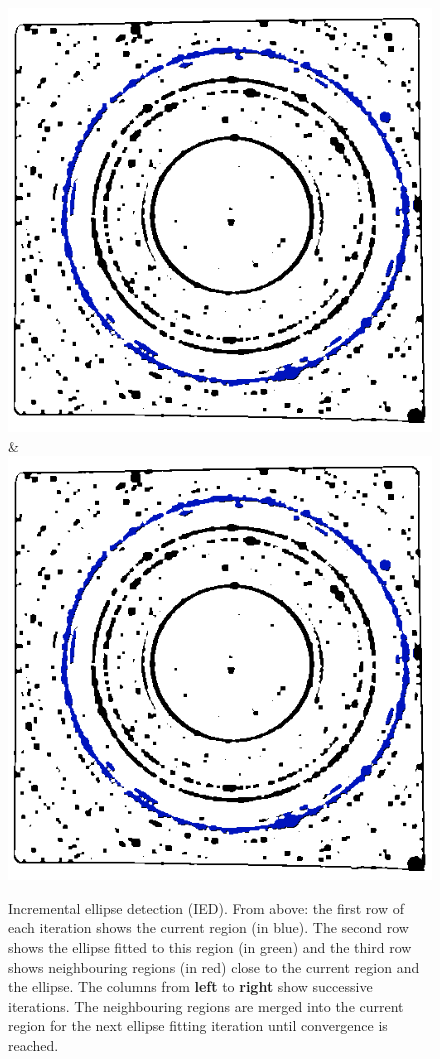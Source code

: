 \documentclass[preprint]{iucr}              %
\begin{document}
\begin{figure}
\begin{tabular}
\includegraphics[width=\linewidth]{Detail/o_Si12_0002_R_2_6.png}&
\includegraphics[width=\linewidth]{Detail/o_Si12_0002_RF_2_7.png}
\end{tabular}
\caption{Incremental ellipse detection (IED). From above: the first row of each iteration shows the current region (in blue). The second row shows the ellipse fitted to this region (in green) and the third row shows neighbouring regions (in red) close to the current region and the ellipse. The columns from \textbf{left} to \textbf{right} show successive iterations. The neighbouring regions are merged into the current region for the next ellipse fitting iteration until convergence is reached.}

\label{fig:working}
\end{figure}
\end{document}
